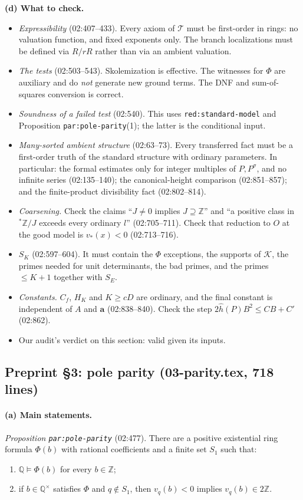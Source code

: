 \documentclass[11pt]{article}
\theoremstyle{definition}
\newcommand{\Q}{\mathbb Q}
\newcommand{\Z}{\mathbb Z}
\newcommand{\sZ}{{}^*\Z}
\newcommand{\Kmult}{\mathcal K}
\newcommand{\lbl}[1]{\texttt{#1}}
\newcommand{\src}[1]{\textsf{#1}}
\newcommand{\checkhead}{\par\smallskip\noindent\textbf{(d) What to check.}\ }
\begin{document}
\checkhead
\begin{itemize}
\item \emph{Expressibility} (\src{02:407--433}).  Every axiom of
$\mathcal T$ must be first-order in rings: no valuation function, and
fixed exponents only.  The branch localizations must be defined via
$R/rR$ rather than via an ambient valuation.
\item \emph{The tests} (\src{02:503--543}).  Skolemization is effective.
The witnesses for $\Phi$ are auxiliary and do \emph{not} generate new
ground terms.  The DNF and sum-of-squares conversion is correct.
\item \emph{Soundness of a failed test} (\src{02:540}).  This uses
\lbl{red:standard-model} and Proposition \lbl{par:pole-parity}(1); the
latter is the conditional input.
\item \emph{Many-sorted ambient structure} (\src{02:63--73}).  Every
transferred fact must be a first-order truth of the standard structure
with ordinary parameters.  In particular: the formal estimates only for
integer multiples of $P,P^\sigma$, and no infinite series (\src{02:135--140});
the canonical-height comparison (\src{02:851--857}); and the finite-product
divisibility fact (\src{02:802--814}).
\item \emph{Coarsening.}  Check the claims ``$J\ne0$ implies $J\supseteq\Z$''
and ``a positive class in $\sZ/J$ exceeds every ordinary $l$''
(\src{02:705--711}).  Check that reduction to $O$ at the good model is
$v_*(x)<0$ (\src{02:713--716}).
\item \emph{$S_K$} (\src{02:597--604}).  It must contain the $\Phi$
exceptions, the supports of $\Kmult$, the primes needed for unit
determinants, the bad primes, and the primes $\le K+1$ together with $S_E$.
\item \emph{Constants.}  $C_f$, $H_K$ and $K\ge cD$ are ordinary, and the
final constant is independent of $A$ and $\mathbf a$ (\src{02:838--840}).
Check the step $2\widehat h(P)B^2\le CB+C'$ (\src{02:862}).
\item Our audit's verdict on this section: valid given its inputs.
\end{itemize}

\subsection{Preprint \S3: pole parity (\src{03-parity.tex}, 718 lines)}

\paragraph{(a) Main statements.}
\emph{Proposition \lbl{par:pole-parity}} (\src{02:477}).  There are a
positive existential ring formula $\Phi(b)$ with rational coefficients and
a finite set $S_1$ such that:
\begin{enumerate}[label=(\arabic*)]
\item $\Q\models\Phi(b)$ for every $b\in\Z$;
\item if $b\in\Q^\times$ satisfies $\Phi$ and $q\notin S_1$, then
$v_q(b)<0$ implies $v_q(b)\in2\Z$.
\end{enumerate}
\end{document}
